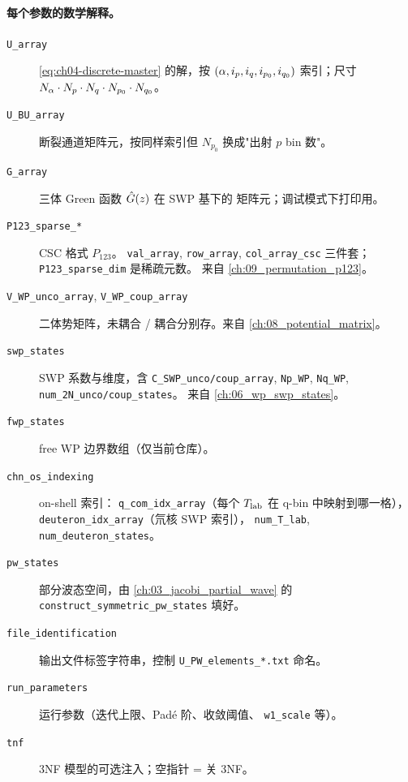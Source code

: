 \paragraph{每个参数的数学解释。}
\begin{description}
  \item[\texttt{U\_array}] \cref{eq:ch04-discrete-master} 的解，按
        \((\alpha, i_p, i_q, i_{p_0}, i_{q_0})\) 索引；尺寸
        \(N_\alpha \cdot N_p \cdot N_q \cdot N_{p_0} \cdot N_{q_0}\)。
  \item[\texttt{U\_BU\_array}] 断裂通道矩阵元，按同样索引但 \(N_{p_0}\)
        换成"出射 \(p\) bin 数"。
  \item[\texttt{G\_array}] 三体 Green 函数 \(\hat{G}(z)\) 在 SWP 基下的
        矩阵元；调试模式下打印用。
  \item[\texttt{P123\_sparse\_*}] CSC 格式 \(P_{123}\)。
        \texttt{val\_array}, \texttt{row\_array}, \texttt{col\_array\_csc}
        三件套；\texttt{P123\_sparse\_dim} 是稀疏元数。
        来自 \cref{ch:09_permutation_p123}。
  \item[\texttt{V\_WP\_unco\_array}, \texttt{V\_WP\_coup\_array}]
        二体势矩阵，未耦合 / 耦合分别存。来自 \cref{ch:08_potential_matrix}。
  \item[\texttt{swp\_states}] SWP 系数与维度，含 \texttt{C\_SWP\_unco/coup\_array},
        \texttt{Np\_WP}, \texttt{Nq\_WP}, \texttt{num\_2N\_unco/coup\_states}。
        来自 \cref{ch:06_wp_swp_states}。
  \item[\texttt{fwp\_states}] free WP 边界数组（仅当前仓库）。
  \item[\texttt{chn\_os\_indexing}] on-shell 索引：
        \texttt{q\_com\_idx\_array}（每个 \({T_{\text{lab}}}\) 在 q-bin 中映射到哪一格），
        \texttt{deuteron\_idx\_array}（氘核 SWP 索引），
        \texttt{num\_T\_lab}, \texttt{num\_deuteron\_states}。
  \item[\texttt{pw\_states}] 部分波态空间，由
        \cref{ch:03_jacobi_partial_wave} 的 \texttt{construct\_symmetric\_pw\_states}
        填好。
  \item[\texttt{file\_identification}] 输出文件标签字符串，控制
        \texttt{U\_PW\_elements\_*.txt} 命名。
  \item[\texttt{run\_parameters}] 运行参数（迭代上限、Padé 阶、收敛阈值、
        \texttt{w1\_scale} 等）。
  \item[\texttt{tnf}] 3NF 模型的可选注入；空指针 = 关 3NF。
\end{description}

